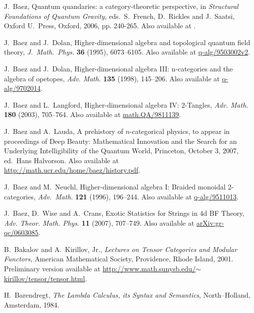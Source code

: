 \documentclass[12pt,twoside,openright]{report}
\begin{document}
\begin{thebibliography}{99}
 J.\ Baez, Quantum quandaries: a category-theoretic perspective, in {\sl Structural Foundations of Quantum Gravity}, eds.\
S.\ French, D.\ Rickles and J.\ Saatsi, Oxford U.\ Press, Oxford,
2006, pp. 240-265.  Also available at \quantph{0404040}.

 J.\ Baez and J.\ Dolan, Higher-dimensional algebra and topological quantum field theory, \emph{J.\ Math.\ Phys.} \textbf{36} (1995), 6073--6105.  Also available at \href{http://arxiv.org/abs/q-alg/9503002v2}{q-alg/9503002v2}.

 J.\ Baez and J.\ Dolan, Higher-dimensional algebra III: n-categories and the algebra of opetopes, \emph{Adv. Math.} \textbf{135} (1998), 145--206.  Also available at \href{http://arxiv.org/abs/q-alg/9702014}{q-alg/9702014}.

 J.\ Baez and L.\ Langford, Higher-dimensional algebra IV: 2-Tangles, \textsl{Adv. Math.} \textbf{180} (2003), 705--764. Also available at \href{http://arxiv.org/abs/math.QA/9811139}{math.QA/9811139}.

 J.\ Baez and A.\ Lauda, A prehistory of $n$-categorical physics, to appear in proceedings of Deep Beauty: Mathematical Innovation and the Search for an Underlying Intelligibility of the Quantum World, Princeton, October 3, 2007, ed.\ Hans Halvorson. Also available at \href{http://math.ucr.edu/home/baez/history.pdf}
{http://math.ucr.edu/home/baez/history.pdf}.

 J.\ Baez and M.\ Neuchl, Higher-dimensional algebra I: Braided monoidal 2-categories, \textsl{Adv.\ Math.} \textbf{121} (1996), 196--244. Also available at \href{http://arxiv.org/abs/q-alg/9511013}{q-alg/9511013}.

J.\ Baez, D.\ Wise and A.\ Crans, Exotic Statistics for Strings in 4d BF Theory, \textsl{Adv. Theor. Math. Phys.} \textbf{11} (2007), 707--749.  Also available at \href{http://arxiv.org/abs/gr-qc/0603085}{arXiv:gr-qc/0603085}.

 B.\ Bakalov and A.\ Kirillov, Jr., {\sl Lectures on Tensor Categories and Modular Functors}, American Mathematical Society, Providence, Rhode Island, 2001.  Preliminary version available at \href{http://www.math.sunysb.edu/~kirillov/tensor/tensor.html}{http://www.math.sunysb.edu/$\sim$kirillov/tensor/tensor.html}.

 H.\ Barendregt, {\sl The Lambda Calculus, its Syntax and Semantics}, North--Holland, Amsterdam, 1984.


\end{thebibliography}
\end{document}
